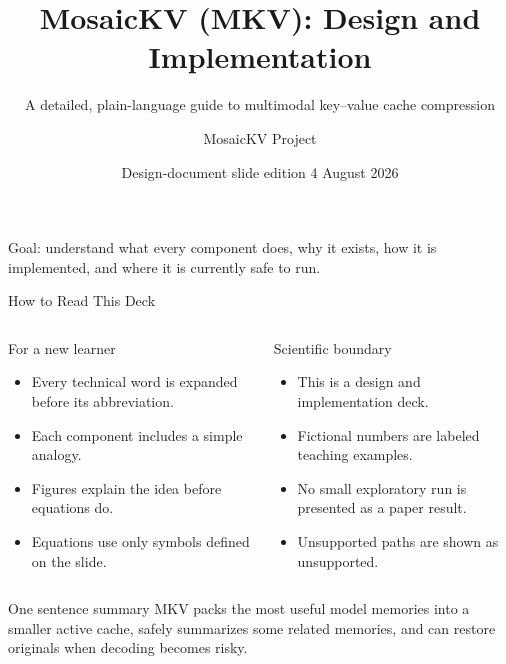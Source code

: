 \documentclass[aspectratio=169,10pt]{beamer}
\title[MosaicKV Design]{MosaicKV (MKV): Design and Implementation}
\subtitle{A detailed, plain-language guide to multimodal key--value cache compression}
\author{MosaicKV Project}
\institute{Training-free Multimodal Inference Research}
\date{Design-document slide edition \textbullet{} 4 August 2026}
\newcommand{\tightitems}{\setlength{\itemsep}{0.28em}\setlength{\parskip}{0pt}}
\begin{document}
\begin{frame}
  \titlepage
  \vspace{-1.2em}
  \begin{center}
    \small
    Goal: understand what every component does, why it exists, how it is implemented,
    and where it is currently safe to run.
  \end{center}
\end{frame}

\begin{frame}{How to Read This Deck}
\small
\begin{columns}[T,onlytextwidth]
\begin{block}{For a new learner}
\begin{itemize}\tightitems
  \item Every technical word is expanded before its abbreviation.
  \item Each component includes a simple analogy.
  \item Figures explain the idea before equations do.
  \item Equations use only symbols defined on the slide.
\end{itemize}
\end{block}
\begin{alertblock}{Scientific boundary}
\begin{itemize}\tightitems
  \item This is a design and implementation deck.
  \item Fictional numbers are labeled teaching examples.
  \item No small exploratory run is presented as a paper result.
  \item Unsupported paths are shown as unsupported.
\end{itemize}
\end{alertblock}
\end{columns}
\vspace{0.6em}
\begin{exampleblock}{One sentence summary}
MKV packs the most useful model memories into a smaller active cache, safely summarizes some
related memories, and can restore originals when decoding becomes risky.
\end{exampleblock}
\end{frame}
\end{document}
